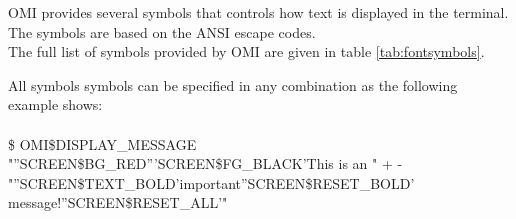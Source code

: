 \documentclass[a4paper]{book}
\newcommand{\vs}{\vspace{3mm}}
\begin{document}
OMI provides several symbols that controls how text is displayed in the terminal. The symbols are based on the ANSI escape codes. \\
The full list of symbols provided by OMI are given in table \ref{tab:fontsymbols}.

\vs

All symbols symbols can be specified in any combination as the following example shows:\\
\\
\textsf{\scriptsize{{\$} OMI{\$}DISPLAY{\_}MESSAGE "''SCREEN{\$}BG{\_}RED'''SCREEN{\$}FG{\_}BLACK'This is an " + - \\ \hspace*{5mm}"''SCREEN{\$}TEXT{\_}BOLD'important''SCREEN{\$}RESET{\_}BOLD' message!''SCREEN{\$}RESET{\_}ALL'"}}
\end{document}
